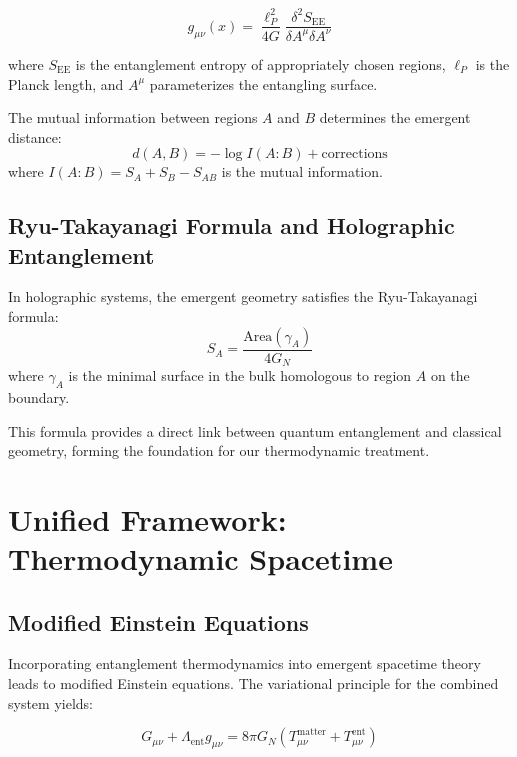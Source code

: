 \documentclass[twocolumn,showpacs,preprintnumbers,amsmath,amssymb,aps]{revtex4-1}
\begin{document}
\begin{equation}
g_{\mu\nu}(x) = \frac{\ell_P^2}{4G} \frac{\delta^2 S_{\text{EE}}}{\delta A^\mu \delta A^\nu}
\label{eq:metric_emergence}
\end{equation}

where $S_{\text{EE}}$ is the entanglement entropy of appropriately chosen regions, $\ell_P$ is the Planck length, and $A^\mu$ parameterizes the entangling surface.

The mutual information between regions $A$ and $B$ determines the emergent distance:
\begin{equation}
d(A,B) = -\log I(A:B) + \text{corrections}
\label{eq:distance_formula}
\end{equation}
where $I(A:B) = S_A + S_B - S_{AB}$ is the mutual information.

\subsection{Ryu-Takayanagi Formula and Holographic Entanglement}

In holographic systems, the emergent geometry satisfies the Ryu-Takayanagi formula:
\begin{equation}
S_A = \frac{\text{Area}(\gamma_A)}{4G_N}
\label{eq:rt_formula}
\end{equation}
where $\gamma_A$ is the minimal surface in the bulk homologous to region $A$ on the boundary.

This formula provides a direct link between quantum entanglement and classical geometry, forming the foundation for our thermodynamic treatment.

\section{Unified Framework: Thermodynamic Spacetime}

\subsection{Modified Einstein Equations}

Incorporating entanglement thermodynamics into emergent spacetime theory leads to modified Einstein equations. The variational principle for the combined system yields:

\begin{equation}
G_{\mu\nu} + \Lambda_{\text{ent}} g_{\mu\nu} = 8\pi G_N (T_{\mu\nu}^{\text{matter}} + T_{\mu\nu}^{\text{ent}})
\label{eq:modified_einstein}
\end{equation}
\end{document}
